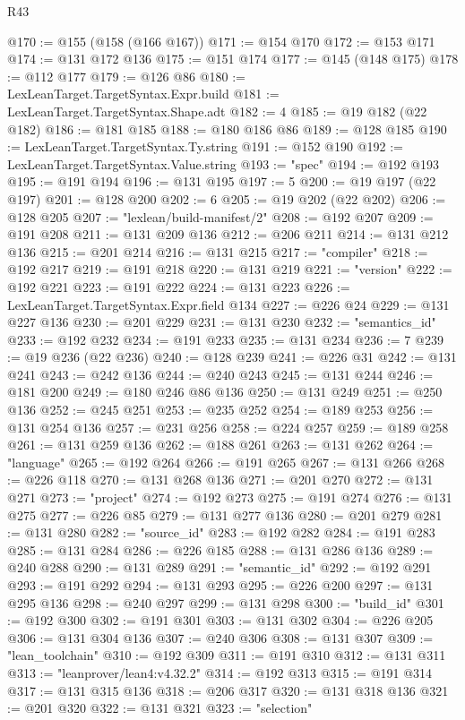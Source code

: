 \begin{lexlean}{R43}
\begin{coremodule}
@170 := @155 (@158 (@166 @167))
@171 := @154 @170
@172 := @153 @171
@174 := @131 @172 @136
@175 := @151 @174
@177 := @145 (@148 @175)
@178 := @112 @177
@179 := @126 @86
@180 := LexLeanTarget.TargetSyntax.Expr.build
@181 := LexLeanTarget.TargetSyntax.Shape.adt
@182 := 4
@185 := @19 @182 (@22 @182)
@186 := @181 @185
@188 := @180 @186 @86
@189 := @128 @185
@190 := LexLeanTarget.TargetSyntax.Ty.string
@191 := @152 @190
@192 := LexLeanTarget.TargetSyntax.Value.string
@193 := "spec"
@194 := @192 @193
@195 := @191 @194
@196 := @131 @195
@197 := 5
@200 := @19 @197 (@22 @197)
@201 := @128 @200
@202 := 6
@205 := @19 @202 (@22 @202)
@206 := @128 @205
@207 := "lexlean/build-manifest/2"
@208 := @192 @207
@209 := @191 @208
@211 := @131 @209 @136
@212 := @206 @211
@214 := @131 @212 @136
@215 := @201 @214
@216 := @131 @215
@217 := "compiler"
@218 := @192 @217
@219 := @191 @218
@220 := @131 @219
@221 := "version"
@222 := @192 @221
@223 := @191 @222
@224 := @131 @223
@226 := LexLeanTarget.TargetSyntax.Expr.field @134
@227 := @226 @24
@229 := @131 @227 @136
@230 := @201 @229
@231 := @131 @230
@232 := "semantics_id"
@233 := @192 @232
@234 := @191 @233
@235 := @131 @234
@236 := 7
@239 := @19 @236 (@22 @236)
@240 := @128 @239
@241 := @226 @31
@242 := @131 @241
@243 := @242 @136
@244 := @240 @243
@245 := @131 @244
@246 := @181 @200
@249 := @180 @246 @86 @136
@250 := @131 @249
@251 := @250 @136
@252 := @245 @251
@253 := @235 @252
@254 := @189 @253
@256 := @131 @254 @136
@257 := @231 @256
@258 := @224 @257
@259 := @189 @258
@261 := @131 @259 @136
@262 := @188 @261
@263 := @131 @262
@264 := "language"
@265 := @192 @264
@266 := @191 @265
@267 := @131 @266
@268 := @226 @118
@270 := @131 @268 @136
@271 := @201 @270
@272 := @131 @271
@273 := "project"
@274 := @192 @273
@275 := @191 @274
@276 := @131 @275
@277 := @226 @85
@279 := @131 @277 @136
@280 := @201 @279
@281 := @131 @280
@282 := "source_id"
@283 := @192 @282
@284 := @191 @283
@285 := @131 @284
@286 := @226 @185
@288 := @131 @286 @136
@289 := @240 @288
@290 := @131 @289
@291 := "semantic_id"
@292 := @192 @291
@293 := @191 @292
@294 := @131 @293
@295 := @226 @200
@297 := @131 @295 @136
@298 := @240 @297
@299 := @131 @298
@300 := "build_id"
@301 := @192 @300
@302 := @191 @301
@303 := @131 @302
@304 := @226 @205
@306 := @131 @304 @136
@307 := @240 @306
@308 := @131 @307
@309 := "lean_toolchain"
@310 := @192 @309
@311 := @191 @310
@312 := @131 @311
@313 := "leanprover/lean4:v4.32.2"
@314 := @192 @313
@315 := @191 @314
@317 := @131 @315 @136
@318 := @206 @317
@320 := @131 @318 @136
@321 := @201 @320
@322 := @131 @321
@323 := "selection"

\end{coremodule}
\end{lexlean}
